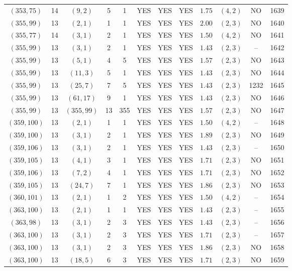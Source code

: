 \begin{longtable}{|c|c|c|c|c|c|c|c|c|c|c|c|}
$(353,75)$ & 14 & $(9,2)$ & 5 & 1 & YES & YES & YES & $1.75$ & $(4,2)$ & NO & 1639\\
$(355,99)$ & 13 & $(2,1)$ & 1 & 1 & YES & YES & YES & $2.00$ & $(2,3)$ & NO & 1640\\
$(355,77)$ & 14 & $(3,1)$ & 2 & 1 & YES & YES & YES & $1.50$ & $(4,2)$ & NO & 1641\\
$(355,99)$ & 13 & $(3,1)$ & 2 & 1 & YES & YES & YES & $1.43$ & $(2,3)$ & -- & 1642\\
$(355,99)$ & 13 & $(5,1)$ & 4 & 5 & YES & YES & YES & $1.57$ & $(2,3)$ & NO & 1643\\
$(355,99)$ & 13 & $(11,3)$ & 5 & 1 & YES & YES & YES & $1.43$ & $(2,3)$ & NO & 1644\\
$(355,99)$ & 13 & $(25,7)$ & 7 & 5 & YES & YES & YES & $1.43$ & $(2,3)$ & 1232 & 1645\\
$(355,99)$ & 13 & $(61,17)$ & 9 & 1 & YES & YES & YES & $1.43$ & $(2,3)$ & NO & 1646\\
$(355,99)$ & 13 & $(355,99)$ & 13 & 355 & YES & YES & YES & $1.57$ & $(2,3)$ & NO & 1647\\
$(359,100)$ & 13 & $(2,1)$ & 1 & 1 & YES & YES & YES & $1.50$ & $(4,2)$ & -- & 1648\\
$(359,100)$ & 13 & $(3,1)$ & 2 & 1 & YES & YES & YES & $1.89$ & $(2,3)$ & NO & 1649\\
$(359,106)$ & 13 & $(3,1)$ & 2 & 1 & YES & YES & YES & $1.43$ & $(2,3)$ & -- & 1650\\
$(359,105)$ & 13 & $(4,1)$ & 3 & 1 & YES & YES & YES & $1.71$ & $(2,3)$ & NO & 1651\\
$(359,106)$ & 13 & $(7,2)$ & 4 & 1 & YES & YES & YES & $1.71$ & $(2,3)$ & NO & 1652\\
$(359,105)$ & 13 & $(24,7)$ & 7 & 1 & YES & YES & YES & $1.86$ & $(2,3)$ & NO & 1653\\
$(360,101)$ & 13 & $(2,1)$ & 1 & 2 & YES & YES & YES & $1.50$ & $(4,2)$ & -- & 1654\\
$(363,100)$ & 13 & $(2,1)$ & 1 & 1 & YES & YES & YES & $1.43$ & $(2,3)$ & -- & 1655\\
$(363,98)$ & 13 & $(3,1)$ & 2 & 3 & YES & YES & YES & $1.43$ & $(2,3)$ & -- & 1656\\
$(363,100)$ & 13 & $(3,1)$ & 2 & 3 & YES & YES & YES & $1.71$ & $(2,3)$ & -- & 1657\\
$(363,100)$ & 13 & $(3,1)$ & 2 & 3 & YES & YES & YES & $1.86$ & $(2,3)$ & NO & 1658\\
$(363,100)$ & 13 & $(18,5)$ & 6 & 3 & YES & YES & YES & $1.71$ & $(2,3)$ & NO & 1659\\

\end{longtable}
